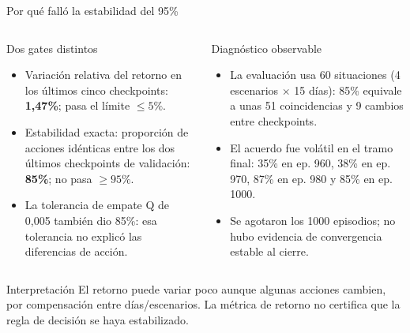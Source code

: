 \documentclass[aspectratio=169,10pt]{beamer}
\begin{document}
\begin{frame}{Por qué falló la estabilidad del 95\%}
\begin{columns}[T]
\begin{block}{Dos gates distintos}
\begin{itemize}
  \item Variación relativa del retorno en los últimos cinco checkpoints:
        \textbf{1,47\%}; pasa el límite \(\leq 5\%\).
  \item Estabilidad exacta: proporción de acciones idénticas entre los dos
        últimos checkpoints de validación: \textbf{85\%}; no pasa
        \(\geq 95\%\).
  \item La tolerancia de empate Q de 0,005 también dio 85\%: esa tolerancia no
        explicó las diferencias de acción.
\end{itemize}
\end{block}
\begin{block}{Diagnóstico observable}
\begin{itemize}
  \item La evaluación usa 60 situaciones (4 escenarios \(\times\) 15 días):
        85\% equivale a unas 51 coincidencias y 9 cambios entre checkpoints.
  \item El acuerdo fue volátil en el tramo final: 35\% en ep. 960,
        38\% en ep. 970, 87\% en ep. 980 y 85\% en ep. 1000.
  \item Se agotaron los 1000 episodios; no hubo evidencia de convergencia
        estable al cierre.
\end{itemize}
\end{block}
\end{columns}
\vspace{0.2em}
\begin{alertblock}{Interpretación}
El retorno puede variar poco aunque algunas acciones cambien, por compensación
entre días/escenarios. La métrica de retorno no certifica que la regla de
decisión se haya estabilizado.
\end{alertblock}
\end{frame}
\end{document}
